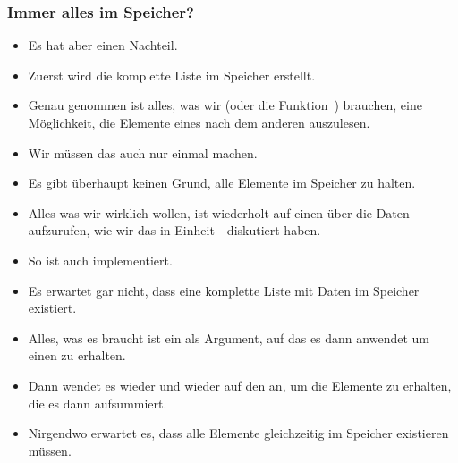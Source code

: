 \documentclass[aspectratio=169,mathserif,notheorems]{beamer}%
\begin{document}
%
\begin{frame}%
\frametitle{Immer alles im Speicher?}%
\begin{itemize}%
%
\item Es hat aber einen Nachteil.
%
\item<2-> Zuerst wird die komplette Liste im Speicher erstellt.%
%
\item<3-> Genau genommen ist alles, was wir (oder die Funktion~) brauchen, eine Möglichkeit, die Elemente eines nach dem anderen auszulesen.%
%
\item<4-> Wir müssen das auch nur einmal machen.%
%
\item<5-> Es gibt überhaupt keinen Grund, alle Elemente im Speicher zu halten.%
%
\item<6-> Alles was wir wirklich wollen, ist wiederholt  auf einen  über die Daten aufzurufen, wie wir das in Einheit~\unitIteration\ diskutiert haben.%
%
\item<7-> So ist  auch implementiert.%
%
\item<8-> Es erwartet gar nicht, dass eine komplette Liste mit Daten im Speicher existiert.%
%
\item<9-> Alles, was es braucht ist ein  als Argument, auf das es dann  anwendet um einen  zu erhalten.%
%
\item<10-> Dann wendet es wieder und wieder  auf den  an, um die Elemente zu erhalten, die es dann aufsummiert.%
%
\item<11-> Nirgendwo erwartet es, dass alle Elemente gleichzeitig im Speicher existieren müssen.
\end{itemize}%
\end{frame}%
%
\end{document}
